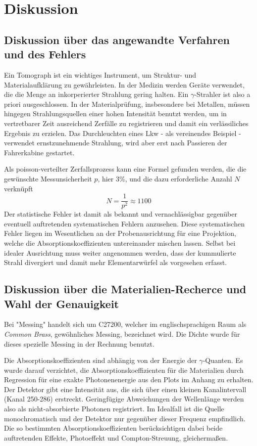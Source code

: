 \section{Diskussion}
\label{sec:Diskussion}

\subsection{Diskussion über das angewandte Verfahren und des Fehlers}
\label{sec:Diskussion1}
Ein Tomograph ist ein wichtiges Instrument, um Struktur- und Materialaufklärung
zu gewährleisten. In der Medizin werden Geräte verwendet, die die Menge an
inkorperierter Strahlung gering halten. Ein $\gamma$-Strahler ist also a priori
ausgeschlossen. In der Materialprüfung, insbesondere bei Metallen, müssen hingegen
Strahlungsquellen einer hohen Intensität benutzt werden, um in vertretbarer Zeit
ausreichend Zerfälle zu registrieren und damit ein verlässiliches Ergebnis zu
erzielen. Das Durchleuchten eines Lkw - als vereinendes Beispiel - verwendet
ernstzunehmende Strahlung, wird aber erst nach Passieren der Fahrerkabine gestartet.

Als poisson-verteilter Zerfallsprozess kann eine Formel gefunden werden, die die
gewünschte Messunsicherheit $p$, hier 3\%, und die dazu erforderliche Anzahl $N$
verknüpft
\begin{equation}
  N=\frac{1}{p^2}\approx 1100
\end{equation}
Der statistische Fehler ist damit als bekannt und vernachlässigbar gegenüber eventuell
auftretenden systematischen Fehlern anzusehen. Diese systematischen Fehler liegen
im Wesentlichen an der Probenausrichtung für eine Projektion, welche die Absorptionskoeffizienten
untereinander mischen lassen. Selbst bei idealer Ausrichtung muss weiter angenommen
werden, dass der kummulierte Strahl divergiert und damit mehr Elementarwürfel als
vorgesehen erfasst.

\subsection{Diskussion über die Materialien-Recherce und Wahl der Genauigkeit}
\label{sec:Diskussion2}
Bei "Messing" handelt sich um C27200, welcher im englischsprachigen Raum
als \textit{Common Brass}, gewöhnliches Messing, bezeichnet wird. Die Dichte
wurde für dieses spezielle Messing in der Rechnung benutzt.

Die Absorptionskoeffizienten sind abhängig von der Energie der $\gamma$-Quanten.
Es wurde darauf verzichtet, die Absorptionskoeffizienten für die Materialien durch
Regression für eine exakte Photonenenergie aus den Plots im Anhang zu erhalten.
Der Detektor gibt eine Intensität aus, die sich über einen kleinen Kanalintervall
(Kanal 250-286) erstreckt. Geringfügige Abweichungen der Wellenlänge werden also
als nicht-absorbierte Photonen registriert.
Im Idealfall ist die Quelle monochromatisch und der Detektor nur gegenüber dieser
Frequenz empfindlich. Die so bestimmten Absorptionskoeffizienten berücksichtigen
dabei beide auftretenden Effekte, Photoeffekt und Compton-Streuung, gleichermaßen.

